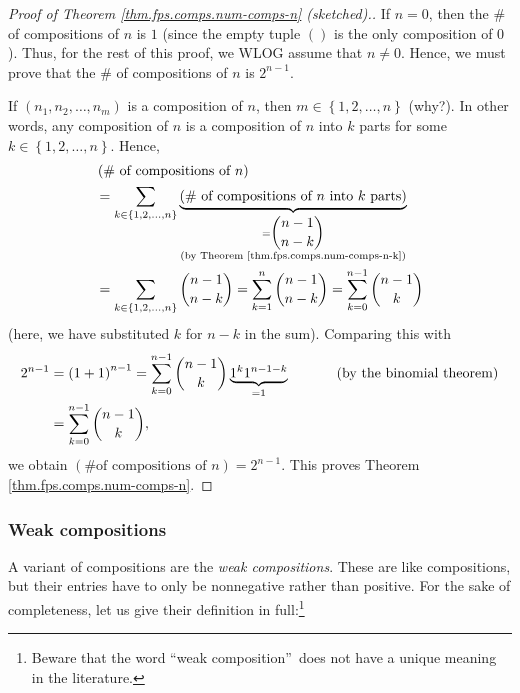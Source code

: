\begin{proof}
[Proof of Theorem \ref{thm.fps.comps.num-comps-n} (sketched).]If $n=0$, then
the \# of compositions of $n$ is $1$ (since the empty tuple $\left(
{}\right)  $ is the only composition of $0$). Thus, for the rest of this
proof, we WLOG assume that $n\neq0$. Hence, we must prove that the \# of
compositions of $n$ is $2^{n-1}$.

If $\left(  n_{1},n_{2},\ldots,n_{m}\right)  $ is a composition of $n$, then
$m\in\left\{  1,2,\ldots,n\right\}  $ (why?). In other words, any composition
of $n$ is a composition of $n$ into $k$ parts for some $k\in\left\{
1,2,\ldots,n\right\}  $. Hence,%
\begin{align*}
&  \left(  \text{\# of compositions of }n\right) \\
&  =\sum_{k\in\left\{  1,2,\ldots,n\right\}  }\underbrace{\left(  \text{\# of
compositions of }n\text{ into }k\text{ parts}\right)  }_{\substack{=\dbinom
{n-1}{n-k}\\\text{(by Theorem \ref{thm.fps.comps.num-comps-n-k})}}}\\
&  =\sum_{k\in\left\{  1,2,\ldots,n\right\}  }\dbinom{n-1}{n-k}=\sum_{k=1}%
^{n}\dbinom{n-1}{n-k}=\sum_{k=0}^{n-1}\dbinom{n-1}{k}%
\end{align*}
(here, we have substituted $k$ for $n-k$ in the sum). Comparing this with%
\begin{align*}
2^{n-1}  &  =\left(  1+1\right)  ^{n-1}=\sum_{k=0}^{n-1}\dbinom{n-1}%
{k}\underbrace{1^{k}1^{n-1-k}}_{=1}\ \ \ \ \ \ \ \ \ \ \left(  \text{by the
binomial theorem}\right) \\
&  =\sum_{k=0}^{n-1}\dbinom{n-1}{k},
\end{align*}
we obtain $\left(  \text{\# of compositions of }n\right)  =2^{n-1}$. This
proves Theorem \ref{thm.fps.comps.num-comps-n}.
\end{proof}

\subsubsection{Weak compositions}

A variant of compositions are the \emph{weak compositions}. These are like
compositions, but their entries have to only be nonnegative rather than
positive. For the sake of completeness, let us give their definition in
full:\footnote{Beware that the word \textquotedblleft weak
composition\textquotedblright\ does not have a unique meaning in the
literature.}

